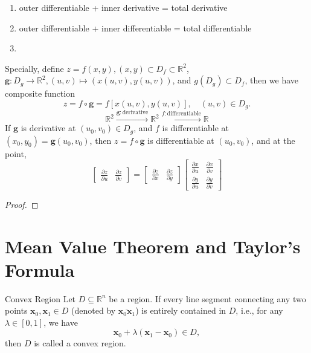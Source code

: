 \documentclass[11pt]{elegantbook}
\begin{document}
\begin{note}
    \begin{enumerate}
        \item  outer differentiable + inner derivative = total derivative
        \item  outer differentiable + inner differentiable = total differentiable
        \item  
    \end{enumerate}
\end{note}

Specially, define \( z = f(x, y), (x,y)\subset D_{f}\subset \mathbb{R}^{2} \), 
\(\mathbf{g}:D_{g}\to \mathbb{R}^{2}, (u,v)\mapsto (x(u,v), y(u,v))\), 
and \(g(D_{g})\subset D_{f}\), 
then we have composite function
\[
z = f \circ \mathbf{g} = f\left[x(u,v), y(u,v)\right],\quad (u,v)\in D_{g}.
\]
\[
\mathbb{R}^{2}\xrightarrow{\mathbf{g}:\text{derivative}}\mathbb{R}^{2}\xrightarrow{f:\text{differentiable}}\mathbb{R}
\]
If \(\mathbf{g}\) is derivative at \((u_{0}, v_{0})\in D_{g}\), 
and \(f\) is differentiable at \((x_{0}, y_{0}) = \mathbf{g}(u_{0}, v_{0})\), 
then \(z = f \circ \mathbf{g}\) is differentiable at \((u_{0}, v_{0})\), and at the point,
\[
    \begin{bmatrix} 
        \frac{\partial z}{\partial u}   & \frac{\partial z}{\partial v} 
    \end{bmatrix} 
    =
    \begin{bmatrix}
        \frac{\partial z}{\partial x} & \frac{\partial z}{\partial y}
    \end{bmatrix}
    \begin{bmatrix} 
        \frac{\partial x}{\partial u} & \frac{\partial x}{\partial v} \\
        \frac{\partial y}{\partial u} & \frac{\partial y}{\partial v}
    \end{bmatrix} 
\]

\begin{proof}
    
\end{proof}

\section{Mean Value Theorem and Taylor's Formula}

\begin{definition}{Convex Region}
    Let \(D \subseteq \mathbb{R}^n\) be a region. 
    If every line segment connecting any two points \(\mathbf{x}_0, \mathbf{x}_1 \in D\) 
    (denoted by \(\overline{\mathbf{x}_0 \mathbf{x}_1}\))
    is entirely contained in \(D\), i.e., for any \(\lambda \in [0, 1]\), we have  
    \[
    \mathbf{x}_0 + \lambda (\mathbf{x}_1 - \mathbf{x}_0) \in D,
    \]
    then \(D\) is called a convex region.
\end{definition}
\end{document}
